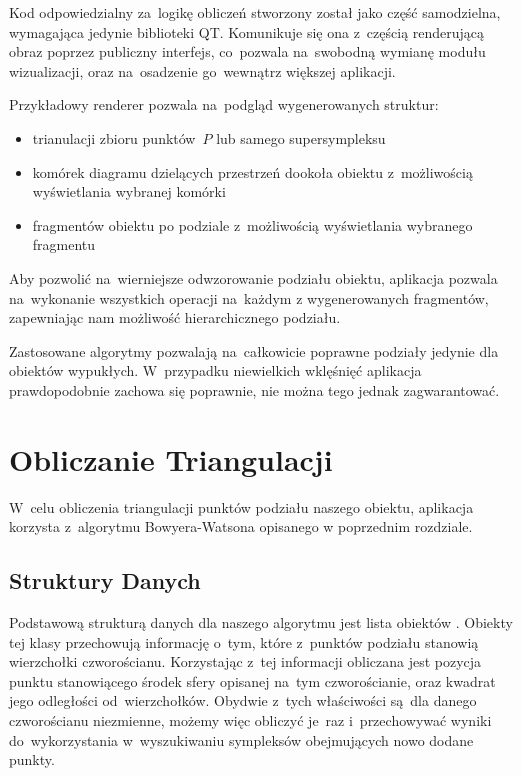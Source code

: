 \documentclass[skorowidz,autorrok,backref,xodstep,oswiadczenie]{wmimgr}
\begin{document}
Kod odpowiedzialny za~logikę obliczeń stworzony został jako część samodzielna, wymagająca jedynie biblioteki QT. Komunikuje się ona z~częścią renderującą obraz poprzez publiczny interfejs, co~pozwala na~swobodną wymianę modułu wizualizacji, oraz na~osadzenie go~wewnątrz większej aplikacji.

Przykładowy renderer pozwala na~podgląd wygenerowanych struktur:
\begin{itemize}
\item
trianulacji zbioru punktów~$P$ lub samego supersympleksu
\item
komórek diagramu dzielących przestrzeń dookoła obiektu z~możliwością wyświetlania wybranej komórki
\item
fragmentów obiektu po podziale z~możliwością wyświetlania wybranego fragmentu
\end{itemize}

Aby pozwolić na~wierniejsze odwzorowanie podziału obiektu, aplikacja pozwala na~wykonanie wszystkich operacji na~każdym z wygenerowanych fragmentów, zapewniając nam możliwość hierarchicznego podziału.

Zastosowane algorytmy pozwalają na~całkowicie poprawne podziały jedynie dla obiektów wypukłych. W~przypadku niewielkich wklęśnięć aplikacja prawdopodobnie zachowa się poprawnie, nie można tego jednak zagwarantować.

\section{Obliczanie Triangulacji}

W~celu obliczenia triangulacji punktów podziału naszego obiektu, aplikacja korzysta z~algorytmu Bowyera-Watsona opisanego w poprzednim rozdziale.

\subsection{Struktury Danych}

Podstawową strukturą danych dla naszego algorytmu jest lista obiektów . Obiekty tej klasy przechowują informację o~tym, które z~punktów podziału stanowią wierzchołki czworościanu. Korzystając z~tej informacji obliczana jest pozycja punktu stanowiącego środek sfery opisanej na~tym czworościanie, oraz kwadrat jego odległości od~wierzchołków. Obydwie z~tych właściwości są~dla danego czworościanu niezmienne, możemy więc obliczyć je~raz i~przechowywać wyniki do~wykorzystania w~wyszukiwaniu sympleksów obejmujących nowo dodane punkty.
\end{document}
